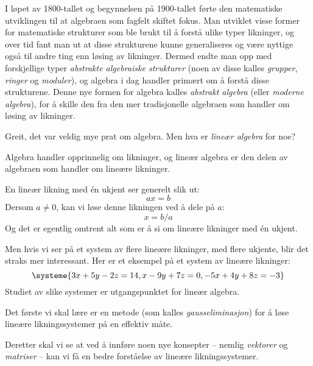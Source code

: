 I løpet av 1800-tallet og begynnelsen på 1900-tallet førte den
matematiske utviklingen til at algebraen som fagfelt skiftet fokus.
Man utviklet visse former for matematiske strukturer som ble
brukt til å forstå ulike typer likninger, og over tid fant man ut at
disse strukturene kunne generaliseres og være nyttige også til andre
ting enn løsing av likninger.  Dermed endte man opp med forskjellige
typer \emph{abstrakte algebraiske strukturer} (noen av disse kalles
\emph{grupper}, \emph{ringer} og \emph{moduler}), og algebra i dag
handler primært om å forstå disse strukturene.  Denne nye formen for
algebra kalles \emph{abstrakt algebra} (eller \emph{moderne algebra}),
for å skille den fra den mer tradisjonelle algebraen som handler om
løsing av likninger.

\medskip
Greit, det var veldig mye prat om algebra.  Men hva er \emph{lineær
  algebra} for noe?

Algebra handler opprinnelig om likninger, og lineær algebra er den
delen av algebraen som handler om lineære likninger.

En lineær likning med én ukjent ser generelt slik ut:
\[
ax = b
\]
Dersom $a \ne 0$, kan vi løse denne likningen ved å dele på $a$:
\[
x = b/a
\]
Og det er egentlig omtrent alt som er å si om lineære likninger med én
ukjent.

Men hvis vi ser på et system av flere lineære likninger, med flere
ukjente, blir det straks mer interessant.  Her er et eksempel på et
system av lineære likninger:
\[
\systeme{
  3x + 5y - 2z = 14,
   x - 9y + 7z = 0,
 -5x + 4y + 8z = -3
}
\]
Studiet av slike systemer er utgangspunktet for lineær algebra.

\smallskip
Det første vi skal lære er en metode (som kalles
\emph{gausseliminasjon}) for å løse lineære likningssystemer på en
effektiv måte.

Deretter skal vi se at ved å innføre noen nye konsepter -- nemlig
\emph{vektorer} og \emph{matriser} -- kan vi få en bedre forståelse av
lineære likningssystemer.

